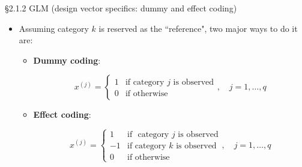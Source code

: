 \documentclass{beamer}
\newenvironment{wideitemize}%
  {\begin{itemize}%
    \setlength{\parskip}{1em}}%
  {\end{itemize}}
\begin{document}
\begin{frame}{\S2.1.2 GLM (design vector specifics: dummy  and effect coding)}
\begin{wideitemize}
\item  Assuming category $k$ is reserved as the ``reference", two major ways to do it are:

\begin{itemize}
\item {\bf Dummy coding}:

\[
x^{(j)} = 
  \begin{cases} 
   1 & \text{if  category $j$ is observed} \\
   0      & \text{if otherwise}  
  \end{cases}, \quad j = 1, \dots, q
\]


\item {\bf Effect coding}:

\[
x^{(j)} = 
  \begin{cases} 
   1 & \text{if } \text{ category $j$ is observed} \\
   -1       & \text{if category $k$ is observed}  \\
    0      & \text{if } \text{otherwise} 
  \end{cases}, \quad j = 1, \dots, q
\]

\end{itemize}

 \end{wideitemize}
\end{frame}
\end{document}
